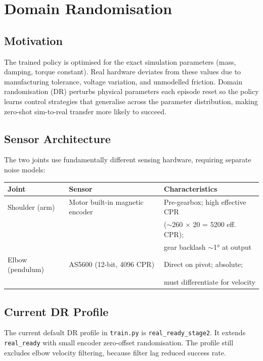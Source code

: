 \documentclass[12pt,a4paper]{article}
\begin{document}
\section{Domain Randomisation}

\subsection{Motivation}

The trained policy is optimised for the exact simulation parameters (mass,
damping, torque constant). Real hardware deviates from these values due to
manufacturing tolerance, voltage variation, and unmodelled friction.
Domain randomisation (DR) perturbs physical parameters each episode reset
so the policy learns control strategies that generalise across the parameter
distribution, making zero-shot sim-to-real transfer more likely to succeed.

\subsection{Sensor Architecture}

The two joints use fundamentally different sensing hardware, requiring separate
noise models:

\begin{center}
\begin{tabular}{lll}
\toprule
\textbf{Joint} & \textbf{Sensor} & \textbf{Characteristics} \\
\midrule
Shoulder (arm) & Motor built-in magnetic encoder & Pre-gearbox; high effective CPR \\
               &                                  & ($\sim$260 $\times$ 20 = 5200 eff. CPR); \\
               &                                  & gear backlash $\sim$1° at output \\
Elbow (pendulum) & AS5600 (12-bit, 4096 CPR)     & Direct on pivot; absolute; \\
                 &                                & must differentiate for velocity \\
\bottomrule
\end{tabular}
\end{center}

\subsection{Current DR Profile}

The current default DR profile in \texttt{train.py} is
\texttt{real\_ready\_stage2}.  It extends \texttt{real\_ready} with small
encoder zero-offset randomisation.  The profile still excludes elbow velocity
filtering, because filter lag reduced success rate.
\end{document}

